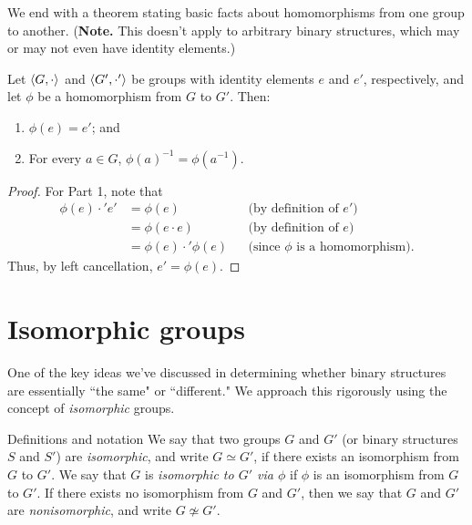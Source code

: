   We end with a theorem stating basic facts about
homomorphisms from one group to another. (\textbf{Note.} This doesn't apply to arbitrary binary structures, which may or may not even have identity elements.)

\begin{thm}\label{homoprops} Let $\langle G,\cdot\rangle$ and $\langle G',\cdot'\rangle$ be groups with identity elements $e$ and $e'$, respectively, and let $\phi$ be a homomorphism from $G$ to $G'$. Then:
\begin{enumerate}
\item $\phi(e)=e'$; and
\item For every $a\in G$, $\phi(a)^{-1}=\phi(a^{-1})$.
\end{enumerate}
\end{thm}

\begin{proof}  For Part 1, note that
\begin{align*}
\phi(e)\cdot'e'&=\phi(e)&&\text{(by definition of $e'$)}\\
&=\phi(e\cdot e) &&\text{(by definition of $e$)}\\
&=\phi(e)\cdot'\phi(e) &&\text{(since $\phi$ is a homomorphism).}
\end{align*}
Thus, by left
cancellation, $e'=\phi(e)$.  \end{proof}

\section{Isomorphic groups}

One of the key ideas we've discussed in determining whether binary
structures are essentially ``the same" or ``different." We approach
this rigorously using the concept of \textit{isomorphic} groups.

\begin{df}{Definitions and notation} We say that two groups  $G$ and $G'$ (or binary
structures $S$ and $S'$) are \textit{isomorphic}, and write
$G\simeq G'$, if there exists an isomorphism from $G$ to $G'$.
We say that $G$ is \textit{isomorphic to $G'$  via $\phi$} if
$\phi$ is an isomorphism from $G$ to $G'$. If there exists no
isomorphism from $G$ and $G'$, then we say that $G$ and $G'$
are \textit{nonisomorphic}, and write $G\not\simeq G'$.\end{df}



